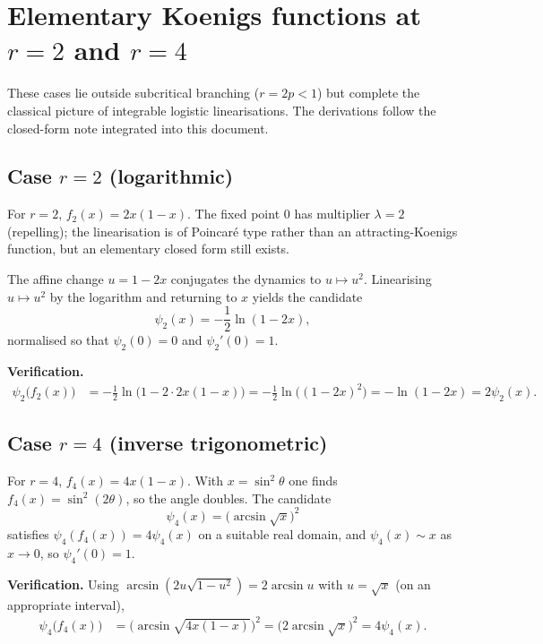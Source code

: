 \documentclass[11pt,a4paper]{article}
\theoremstyle{plain}
\theoremstyle{definition}
\begin{document}
\clearpage
\appendix

\section{Elementary Koenigs functions at $r=2$ and $r=4$}
\label{app:integrable}

These cases lie outside subcritical branching ($r=2p<1$) but complete the classical picture of integrable logistic linearisations. The derivations follow the closed-form note integrated into this document.

\subsection{Case $r=2$ (logarithmic)}

For $r=2$, $f_2(x)=2x(1-x)$. The fixed point $0$ has multiplier $\lambda=2$ (repelling); the linearisation is of Poincar\'e type rather than an attracting-Koenigs function, but an elementary closed form still exists.

The affine change $u=1-2x$ conjugates the dynamics to $u\mapsto u^2$. Linearising $u\mapsto u^2$ by the logarithm and returning to $x$ yields the candidate
\begin{equation}
\label{eq:phi2}
\psi_2(x)=-\frac12\ln(1-2x),
\end{equation}
normalised so that $\psi_2(0)=0$ and $\psi_2'(0)=1$.

\textbf{Verification.}
\begin{align*}
\psi_2\bigl(f_2(x)\bigr)
&=
-\frac12\ln\bigl(1-2\cdot 2x(1-x)\bigr)
=
-\frac12\ln\bigl((1-2x)^2\bigr)
=
-\ln(1-2x)
=
2\psi_2(x).
\end{align*}

\subsection{Case $r=4$ (inverse trigonometric)}

For $r=4$, $f_4(x)=4x(1-x)$. With $x=\sin^2\theta$ one finds $f_4(x)=\sin^2(2\theta)$, so the angle doubles. The candidate
\begin{equation}
\label{eq:phi4}
\psi_4(x)=\bigl(\arcsin\sqrt{x}\bigr)^2
\end{equation}
satisfies $\psi_4(f_4(x))=4\psi_4(x)$ on a suitable real domain, and $\psi_4(x)\sim x$ as $x\to0$, so $\psi_4'(0)=1$.

\textbf{Verification.}
Using $\arcsin(2u\sqrt{1-u^2})=2\arcsin u$ with $u=\sqrt{x}$ (on an appropriate interval),
\begin{align*}
\psi_4\bigl(f_4(x)\bigr)
&=
\bigl(\arcsin\sqrt{4x(1-x)}\bigr)^2
=
\bigl(2\arcsin\sqrt{x}\bigr)^2
=
4\psi_4(x).
\end{align*}
\end{document}
